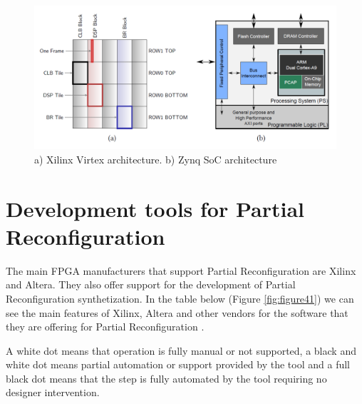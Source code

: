\documentclass[twoside]{romjist}
\begin{document}
	
	\begin{figure}[h]
		\centering
		\includegraphics[width=\textwidth]{fig_3_3}
		\caption{a) Xilinx Virtex architecture. b) Zynq SoC architecture \cite{5}}
		\label{fig:figure33}
	\end{figure}
	
	\section{Development tools for Partial Reconfiguration}
	\hspace{0.5cm}
	The main FPGA manufacturers that support Partial Reconfiguration are Xilinx and Altera.
	They also offer support for the development of Partial Reconfiguration synthetization. In the
	table below \cite{2} (Figure \ref{fig:figure41}) we can see the main features of Xilinx, Altera and other vendors
	for the software that they are offering for Partial Reconfiguration \cite{2} \cite{6}.
	
	
	\hspace{0.5cm}A white dot means that operation is fully manual or not supported, a black and white dot means
	partial automation or support provided by the tool and a full black dot means that the step is
	fully automated by the tool requiring no designer intervention.
	
\end{document}
